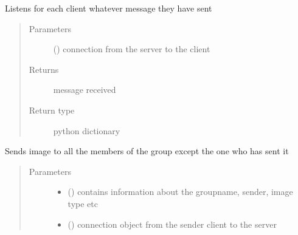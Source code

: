 \documentclass[letterpaper,10pt,english]{sphinxmanual}
\begin{document}

\begin{fulllineitems}
\label{\detokenize{server:server.rec_query}}
Listens for each client whatever message they have sent
\begin{quote}\begin{description}
\item[{Parameters}] \leavevmode
{} () \textendash{} connection from the server to the client

\item[{Returns}] \leavevmode
message received

\item[{Return type}] \leavevmode
python dictionary

\end{description}\end{quote}

\end{fulllineitems}


\begin{fulllineitems}
\label{\detokenize{server:server.send_group_image}}
Sends image to all the members of the group except the one who has sent it
\begin{quote}\begin{description}
\item[{Parameters}] \leavevmode\begin{itemize}
\item {} 
 () \textendash{} contains information about the groupname, sender, image type etc

\item {} 
 () \textendash{} connection object from the sender client to the server

\end{itemize}

\end{description}\end{quote}

\end{fulllineitems}
\end{document}
